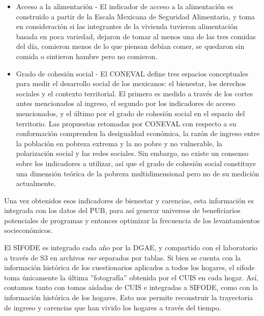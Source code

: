 \begin{itemize}
    \item Acceso a la alimentación - El indicador de acceso a la alimentación es construido a partir de la Escala Mexicana de Seguridad Alimentaria, y toma en consideración si las integrantes de la vivienda tuvieron alimentación basada en poca variedad, dejaron de tomar al menos una de las tres comidas del día, comieron menos de lo que piensan debían comer, se quedaron sin comida o sintieron hambre pero no comieron.
    \item Grado de cohesión social - El CONEVAL define tres espacios conceptuales para medir el desarrollo social de los mexicanos: el bienestar, los derechos sociales y el contexto territorial. El primero es medido a través de los cortes antes mencionados al ingreso, el segundo por los indicadores de acceso mencionados, y el último por el grado de cohesión social en el espacio del territorio. Las propuestas retomadas por CONEVAL con respecto a su conformación comprenden la desigualdad económica, la razón de ingreso entre la población en pobreza extrema y la no pobre y no vulnerable, la polarización social y las redes sociales. Sin embargo, no existe un consenso sobre los indicadores a utilizar, así que el grado de cohesión social constituye una dimensión teórica de la pobreza multidimensional pero no de su medición actualmente.
\end{itemize}
Una vez obtenidos esos indicadores de bienestar y carencias, esta información es integrada con los datos del PUB, para así generar universos de beneficiarios potenciales de programas y entonces optimizar la frecuencia de los levantamientos socieconómicos.
\par
\noindent
El SIFODE es integrado cada año por la DGAE, y compartido con el laboratorio a través de S3 en archivos \textit{rar} separados por tablas. Si bien se cuenta con la información histórica de los cuestionarios aplicados a todos los hogares, el sifode toma únicamente la última ''fotografía'' obtenida por el CUIS en cada hogar. Así, contamos tanto con tomas aisladas de CUIS e integradas a SIFODE, como con la información histórica de los hogares. Esto nos permite reconstruir la trayectoria de ingreso y carencias que han vivido los hogares a través del tiempo.
